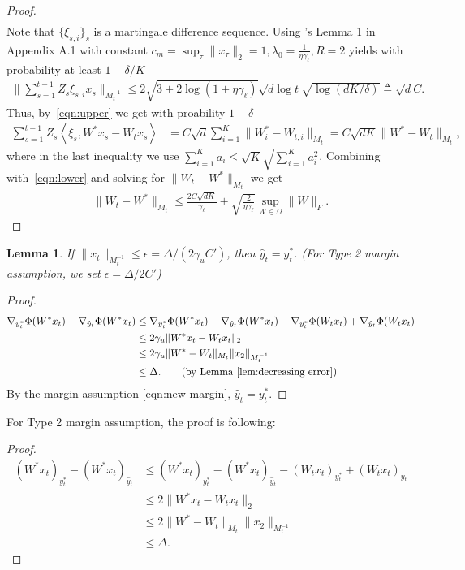 \documentclass{article}
\newcommand{\nb}{\nabla}
\newcommand{\inner}[1]{ \left\langle {#1} \right\rangle }
\newtheorem{lemma}[theorem]{Lemma}
\begin{document}
\begin{proof}
\begin{align}
\end{align}
Note that $\{\xi_{s,i}\}_{s}$ is a martingale difference sequence. Using \cite{filippi2010parametric}'s Lemma 1 in Appendix A.1 with constant $c_m = \sup_\tau\|x_\tau\|_2=1, \lambda_0 = \frac{1}{\eta\gamma_\ell}, R=2$ yields with probability at least $1-\delta/K$
\begin{align*}
    \Bigg\| \sum_{s=1}^{t-1} Z_s\xi_{s,i}x_s \Bigg\|_{M_t^{-1}} \leq 2\sqrt{3+2\log(1+\eta\gamma_\ell)}\sqrt{d\log t}\sqrt{\log(dK/\delta)} \triangleq \sqrt{d}C.
\end{align*}
Thus, by~\eqref{eqn:upper} we get with proability $1-\delta$
\begin{align*}
    \sum_{s=1}^{t-1} Z_s\inner{\xi_s, W^*x_s-W_tx_s} &= C\sqrt{d}\sum_{i=1}^K \|W^*_i-W_{t,i}\|_{M_t} = C\sqrt{dK} \|W^*-W_{t}\|_{M_t}, 
\end{align*}
where in the last inequality we use $\sum_{i=1}^K a_i\leq \sqrt{K}\sqrt{\sum_{i=1}^K a_i^2}$. Combining with~\eqref{eqn:lower} and solving for $\|W_t-W^*\|_{M_t}$ we get 
\begin{align*}
    \|W_t-W^*\|_{M_t} \leq \frac{2C\sqrt{dK}}{\gamma_\ell} + \sqrt{\frac{2}{\eta \gamma_\ell}}\sup_{W\in \Omega}\|W\|_F. 
\end{align*}

\end{proof}

\begin{lemma}
\label{lem: xbounded}
If $\|x_t\|_{M_t^{-1}}\leq \epsilon = \Delta/(2\gamma_u C')$, then $\hat{y}_t=y^*_t$. {\color{blue}(For Type 2 margin assumption, we set $\epsilon=\Delta/2C'$)}
\end{lemma}
\begin{proof}
\begin{align*}
\nb_{y_t^*} \Phi(W^*x_t) - \nb_{\hat{y}_t} \Phi(W^*x_t) 
 &\leq \nb_{y_t^*} \Phi(W^*x_t) -    \nb_{\hat{y}_t} \Phi(W^*x_t) 
 - \nb_{y_t^*} \Phi(W_tx_t) + \nb_{\hat{y}_t} \Phi(W_tx_t) \\
 & \leq 2\gamma_u \|W^*x_t-W_tx_t\|_2 \\
 & \leq 2\gamma_u \|W^*-W_t\|_{M_t}\|x_2\|_{M_t^{-1}} \\
 & \leq \Delta. \tag{by Lemma~\ref{lem:decreasing error}}
\end{align*}
By the margin assumption \eqref{eqn:new margin}, $\hat{y}_t = y_t^*$. 
\end{proof}

{\color{blue} For Type 2 margin assumption, the proof is following:  
\begin{proof}
\begin{align*}
    (W^*x_t)_{y_t^*} - (W^*x_t)_{\hat{y}_t} &\leq (W^*x_t)_{y_t^*} - (W^*x_t)_{\hat{y}_t} - (W_tx_t)_{y_t^*} + (W_tx_t)_{\hat{y}_t} \\
    &\leq 2\|W^*x_t-W_tx_t\|_2\\
    & \leq 2 \|W^*-W_t\|_{M_t}\|x_2\|_{M_t^{-1}} \\
    & \leq \Delta.
\end{align*}
\end{proof}
}
\end{document}

